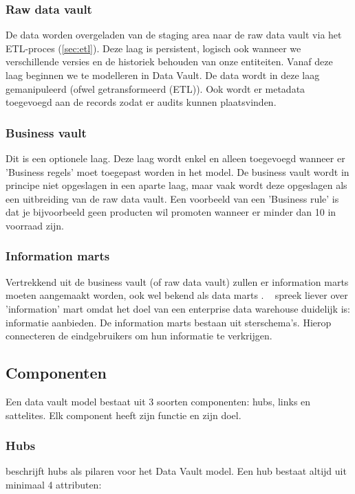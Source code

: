 \subsubsection{Raw data vault}
De data worden overgeladen van de staging area naar de raw data vault via het ETL-proces (\ref{sec:etl}). Deze laag is persistent, logisch ook wanneer we verschillende versies en de historiek behouden van onze entiteiten. Vanaf deze laag beginnen we te modelleren in Data Vault. De data wordt in deze laag gemanipuleerd (ofwel getransformeerd (ETL)). Ook wordt er metadata toegevoegd aan de records zodat er audits kunnen plaatsvinden. 

\subsubsection{Business vault}
Dit is een optionele laag. Deze laag wordt enkel en alleen toegevoegd wanneer er 'Business regels' moet toegepast worden in het model. De business vault wordt in principe niet opgeslagen in een aparte laag, maar vaak wordt deze opgeslagen als een uitbreiding van de raw data vault. Een voorbeeld van een 'Business rule' is dat je bijvoorbeeld geen producten wil promoten wanneer er minder dan 10 in voorraad zijn.

\subsubsection{Information marts}
Vertrekkend uit de business vault (of raw data vault) zullen er information marts moeten aangemaakt worden, ook wel bekend als data marts . ~\textcite{Linstedt2016} spreek liever over 'information' mart omdat het doel van een enterprise data warehouse duidelijk is: informatie aanbieden. 
De information marts bestaan uit sterschema's. Hierop connecteren de eindgebruikers om hun informatie te verkrijgen. 

\subsection{Componenten}
Een data vault model bestaat uit 3 soorten componenten: hubs, links en sattelites. Elk component heeft zijn functie en zijn doel.

\subsubsection{Hubs}
\textcite{Linstedt2016} beschrijft hubs als pilaren voor het Data Vault model. Een hub bestaat altijd uit minimaal 4 attributen:


